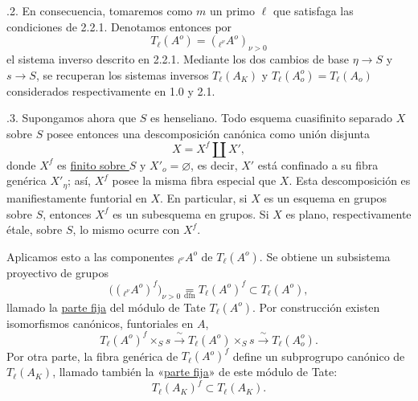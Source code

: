 \medskip
{}.2. En consecuencia, tomaremos como $m$ un primo $\ell$ que
satisfaga las condiciones de 2.2.1. Denotamos entonces por
\begin{equation}\tag{2.2.2.1}
 T_\ell(A^o)=({}_{\ell^\nu}A^o)_{\nu>0}
\end{equation}
el sistema inverso descrito en 2.2.1. Mediante los dos cambios de base
$\eta\longrightarrow S$ y $s\longrightarrow S$, se recuperan los
sistemas inversos $T_\ell(A_K)$ y
$T_\ell(A_o^o)=T_\ell(A_o)$ considerados respectivamente en 1.0 y 2.1.

\medskip
{}.3. Supongamos ahora que $S$ es henseliano. Todo esquema cuasifinito
separado $X$ sobre $S$ posee entonces una descomposición canónica como
unión disjunta
\begin{equation}\tag{2.2.3.1}
 X=X^f\coprod X',
\end{equation}
donde $X^f$ es \underline{finito sobre $S$} y $X'_o=\varnothing$, es
decir, $X'$ está confinado a su fibra genérica $X'_\eta$; así, $X^f$
posee la misma fibra especial que $X$. Esta descomposición es
manifiestamente funtorial en $X$. En particular, si $X$ es un esquema
en grupos sobre $S$, entonces $X^f$ es un subesquema en grupos. Si $X$
es plano, respectivamente étale, sobre $S$, lo mismo ocurre con $X^f$.

Aplicamos esto a las componentes ${}_{\ell^\nu}A^o$ de $T_\ell(A^o)$.
Se obtiene un subsistema proyectivo de grupos
\begin{equation}\tag{2.2.3.2}
 \bigl(({}_{\ell^\nu}A^o)^f\bigr)_{\nu>0}
 \underset{\mathrm{dfn}}{=}T_\ell(A^o)^f
 \subset T_\ell(A^o),
\end{equation}
llamado la \underline{parte fija} del módulo de Tate $T_\ell(A^o)$.
Por construcción existen isomorfismos canónicos, funtoriales en $A$,
\begin{equation}\tag{2.2.3.3}
 T_\ell(A^o)^f\times_S s\xrightarrow{\ \sim\ }
 T_\ell(A^o)\times_Ss\xrightarrow{\ \sim\ }T_\ell(A_o^o).
\end{equation}
Por otra parte, la fibra genérica de $T_\ell(A^o)^f$ define un
subprogrupo canónico de $T_\ell(A_K)$, llamado también la
«\underline{parte fija}» de este módulo de Tate:
\begin{equation}\tag{2.2.3.4}
 T_\ell(A_K)^f\subset T_\ell(A_K).
\end{equation}

